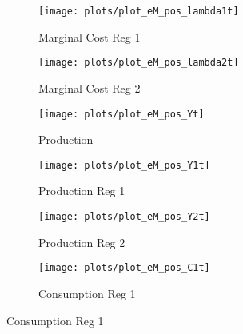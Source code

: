 \documentclass[../thesis.tex]{subfiles}
\begin{document}
\begin{figure}[h!]
\begin{subfigure}[b]{0.27\textwidth}
		\end{subfigure}
		\vspace*{0.1cm}
		\begin{subfigure}[b]{0.27\textwidth}
			\centering
			\texttt{[image: plots/plot\_eM\_pos\_lambda1t]}
			\caption{\scriptsize Marginal Cost Reg 1}
			\label{fig:ZMt-lambda1t}
		\end{subfigure}
		\hspace*{0.5cm}
		\begin{subfigure}[b]{0.27\textwidth}
			\centering
			\texttt{[image: plots/plot\_eM\_pos\_lambda2t]}
			\caption{\scriptsize Marginal Cost Reg 2}
			\label{fig:ZMt-lambda2t}
		\end{subfigure}
		\hspace*{0.5cm}
		\begin{subfigure}[b]{0.27\textwidth}
			\centering
			\texttt{[image: plots/plot\_eM\_pos\_Yt]}
			\caption{\scriptsize Production}
			\label{fig:ZMt-Yt}
		\end{subfigure}
		\vspace*{0.1cm}
		\begin{subfigure}[b]{0.27\textwidth}
			\centering
			\texttt{[image: plots/plot\_eM\_pos\_Y1t]}
			\caption{\scriptsize Production Reg 1}
			\label{fig:ZMt-Y1t}
		\end{subfigure}
		\hspace*{0.5cm}
		\begin{subfigure}[b]{0.27\textwidth}
			\centering
			\texttt{[image: plots/plot\_eM\_pos\_Y2t]}
			\caption{\scriptsize Production Reg 2}
			\label{fig:ZMt-Y2t}
		\end{subfigure}
		\hspace*{0.5cm}
		\begin{subfigure}[b]{0.27\textwidth}
			\centering
			\texttt{[image: plots/plot\_eM\_pos\_C1t]}
			\caption{\scriptsize Consumption Reg 1}
			\label{fig:ZMt-C1t}
		\end{subfigure}

\end{figure}
\end{document}

